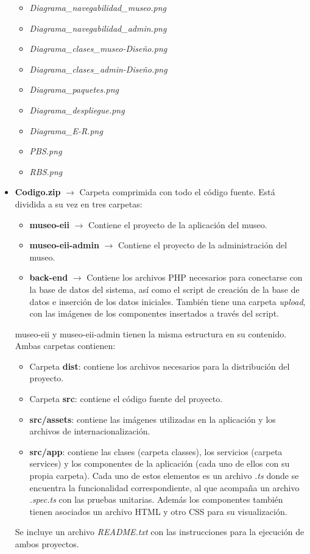 \begin{itemize}
\begin{itemize}
		\item \textit{Diagrama\_navegabilidad\_museo.png}
		\item \textit{Diagrama\_navegabilidad\_admin.png}
		\item \textit{Diagrama\_clases\_museo-Diseño.png}
		\item \textit{Diagrama\_clases\_admin-Diseño.png}
		\item \textit{Diagrama\_paquetes.png}
		\item \textit{Diagrama\_despliegue.png}
		\item \textit{Diagrama\_E-R.png}
		\item \textit{PBS.png}
		\item \textit{RBS.png}
	\end{itemize}
	\item \textbf{Codigo.zip} \(\rightarrow\) Carpeta comprimida con todo el código fuente. Está dividida a su vez en tres carpetas:
	\begin{itemize}
		\item \textbf{museo-eii} \(\rightarrow\) Contiene el proyecto de la aplicación del museo.
		\item \textbf{museo-eii-admin} \(\rightarrow\) Contiene el proyecto de la administración del museo.
		\item \textbf{back-end} \(\rightarrow\) Contiene los archivos PHP necesarios para conectarse con la base de datos del sistema, así como el script de creación de la base de datos e inserción de los datos iniciales. También tiene una carpeta \textit{upload}, con las imágenes de los componentes insertados a través del script.
	\end{itemize}
	museo-eii y museo-eii-admin tienen la misma estructura en su contenido. Ambas carpetas contienen:
	\begin{itemize}
		\item Carpeta \textbf{dist}: contiene los archivos necesarios para la distribución del proyecto.
		\item Carpeta \textbf{src}: contiene el código fuente del proyecto.
		\item \textbf{src/assets}: contiene las imágenes utilizadas en la aplicación y los archivos de internacionalización.
		\item \textbf{src/app}: contiene las clases (carpeta classes), los servicios (carpeta services) y los componentes de la aplicación (cada uno de ellos con su propia carpeta). Cada uno de estos elementos es un archivo \textit{.ts} donde se encuentra la funcionalidad correspondiente, al que acompaña un archivo \textit{.spec.ts} con las pruebas unitarias. Además los componentes también tienen asociados un archivo HTML y otro CSS para su visualización.
	\end{itemize} 
\par Se incluye un archivo \textit{README.txt} con las instrucciones para la ejecución de ambos proyectos.
\end{itemize}